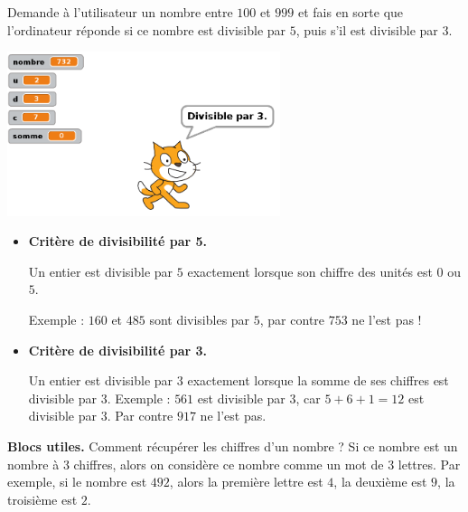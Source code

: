 \documentclass[class=report,crop=false, 12pt]{standalone}
\begin{document}
\begin{activite}

Demande à l'utilisateur un nombre entre $100$ et $999$ et fais en sorte que l'ordinateur réponde si ce nombre est divisible par $5$, puis s'il est divisible par $3$.

\begin{center}
  \includegraphics[width=0.6\textwidth]{ecran-07-ex2} 
\end{center}


\begin{itemize}
  \item \textbf{Critère de divisibilité par 5.}
  
  Un entier est divisible par $5$ exactement lorsque son chiffre des unités est $0$ ou $5$.
  
  Exemple : $160$ et $485$ sont divisibles par $5$, par contre $753$ ne l'est pas !
  
  \item \textbf{Critère de divisibilité par 3.}  
  
  Un entier est divisible par $3$ exactement lorsque la somme de ses chiffres est divisible par $3$.
  Exemple : $561$ est divisible par $3$, car $5+6+1=12$ est divisible par $3$.
  Par contre $917$ ne l'est pas.  
\end{itemize}

\bigskip

\textbf{Blocs utiles.}
Comment récupérer les chiffres d'un nombre ? Si ce nombre est un 
nombre à $3$ chiffres, alors on considère ce nombre comme un mot de $3$ lettres.
Par exemple, si le nombre est $492$, alors la première lettre est $4$, la deuxième est $9$, la troisième est $2$.

\begin{center}

\medskip


\medskip


\end{center} 




\end{activite}
\end{document}
